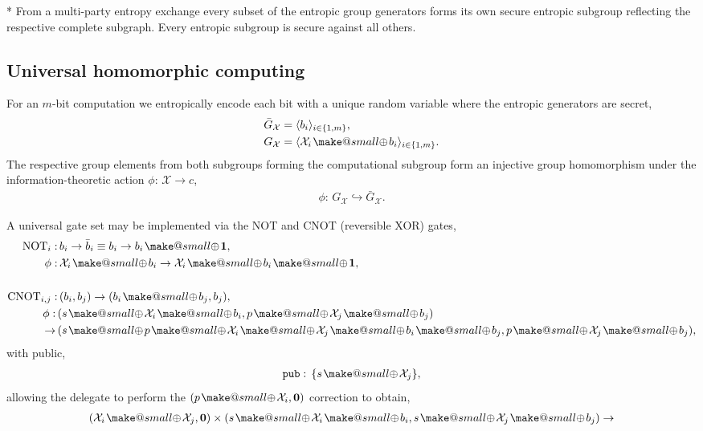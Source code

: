 \documentclass[twocolumn, aps, amsmath, amssymb, nofootinbib, superscriptaddress, longbibliography, doublefloatfix, table-of-contents, eqsecnum, rmp]{revtex4-2}
\makeatletter
\def\zerovec{\mathbf{0}}
\def\onevec{\mathbf{1}}
\newcommand{\soplus}{{{\hspace{1pt}}{\mathbin{\mathpalette\make@small{\mathbin\oplus}}}}{\hspace{1pt}}}
\newcommand{\make@small}[2]{%
  \vcenter{\hbox{%
    \scalebox{0.6}{$\m@th#1#2$}%
  }}%
}
\makeatother
\begin{document}
* From a multi-party entropy exchange every subset of the entropic group generators forms its own secure entropic subgroup reflecting the respective complete subgraph. Every entropic subgroup is secure against all others.

\subsection{Universal homomorphic computing}

For an $m$-bit computation we entropically encode each bit with a unique random variable where the entropic generators are secret,
\begin{align}
	\bar{G}_\mathcal{X} &= \langle b_i \rangle_{i\in\{1,m\}},\nonumber\\
	G_\mathcal{X} &= \langle \mathcal{X}_i \soplus b_i \rangle_{i\in\{1,m\}}.
\end{align}
The respective group elements from both subgroups forming the computational subgroup form an injective group homomorphism under the information-theoretic action $\phi:\, \mathcal{X}\to c$,
\begin{align}
	\phi:\, G_\mathcal{X}  \hookrightarrow \bar{G}_\mathcal{X}.
\end{align}

A universal gate set may be implemented via the NOT and CNOT (reversible XOR) gates,
\begin{align}
	\mathrm{NOT}_i:&\, b_i \to \bar{b}_i \equiv b_i \to b_i\soplus \onevec,\\
	\phi:&\, \mathcal{X}_i\soplus b_i \to \mathcal{X}_i\soplus b_i \soplus \onevec,\nonumber\\
	\nonumber\\
	\mathrm{CNOT}_{i,j}:&\, (b_i,b_j) \to (b_i\soplus b_j,b_j),\nonumber\\
	\phi:\, &(s\soplus \mathcal{X}_i\soplus b_i, p\soplus \mathcal{X}_j\soplus b_j)\nonumber\\
	\to\, &(s\soplus p \soplus \mathcal{X}_i \soplus \mathcal{X}_j \soplus b_i \soplus b_j, p\soplus \mathcal{X}_j\soplus b_j),\nonumber
\end{align}
with public,
\begin{align}
	\mathtt{pub}:\,\{s\soplus \mathcal{X}_j\},
\end{align}
allowing the delegate to perform the $(p\soplus\mathcal{X}_i,\zerovec)$ correction to obtain,
\begin{align}
	(\mathcal{X}_i\soplus\mathcal{X}_j,\zerovec) \times (s\soplus \mathcal{X}_i\soplus b_i, s\soplus \mathcal{X}_j\soplus b_j) \to 
\end{align}
\end{document}
